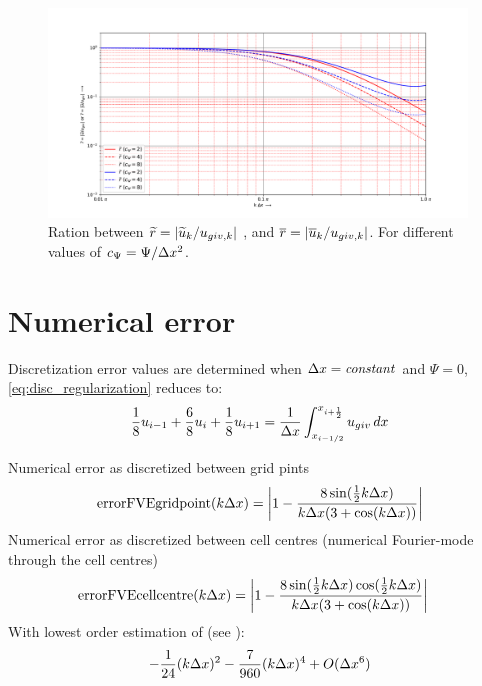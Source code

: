 \begin{figure}[H]
\centering
\includegraphics[width=0.99\textwidth]{figures/ratio_u_u_giv.pdf}
\caption{Ration between $\widetilde{r} = \left| \widetilde{u}_k/u_{giv,k} \right|$ , and $\overline{r} = \left| \overline{u}_k/u_{giv,k} \right|$. For different values of $c_{\Psi} = \Psi/\Delta x^2$.\label{fig:ratio_func}}
\end{figure}
\section{Numerical error}
Discretization error values are determined when  $\Delta x = {\it constant} $ and $\Psi = 0$, \autoref{eq:disc_regularization} reduces to:
\begin{align}
\frac{1}{8}      u_{i-1}
+ \frac{6}{8}   u_i
+ \frac{1}{8}   u_{i+1}  = \frac{1}{\Delta x} \int_{x_{i-1/2}}^{x_{i+\frac{1}{2}}} u_{giv}\, dx
\label{eq:disc_regularization_psi_0}
\end{align}

Numerical error as discretized between grid pints
\begin{align}
{\text{errorFVEgridpoint}}(k\Delta x) = \left|   1- \frac{8 \sin(\frac{1}{2}  k\Delta x)}{k\Delta x  (3 + \cos(k\Delta x))} \right|
\end{align}
Numerical error as discretized between cell centres (numerical Fourier-mode through the cell centres)
\begin{align}
{\text{errorFVEcellcentre}}(k\Delta x) & = \left|  1 - \frac{8 \sin(\frac{1}{2} k\Delta x) \cos(\frac{1}{2} k\Delta x)}{k\Delta x (3 + \cos(k\Delta x))} \right|
\end{align}
With lowest order estimation of (see \citet{funcfitsmoothing_Fouriermodeanalysis2024}):
\begin{align}
-\frac{1}{24} (k\Dx)^2 - \frac{7}{960} (k\Dx)^4 + O(\Dx^6) %
\end{align}

